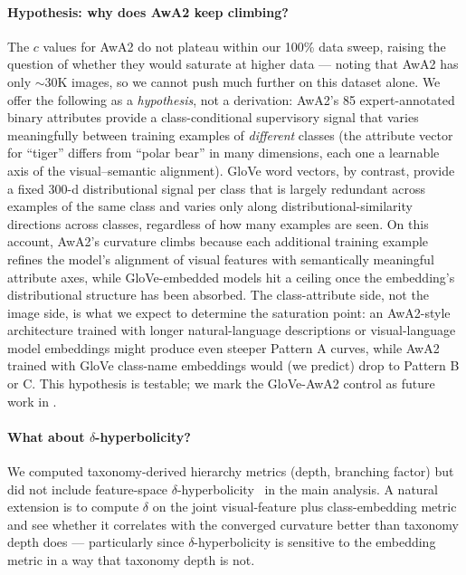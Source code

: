 \documentclass{article}
\begin{document}
\paragraph{Hypothesis: why does AwA2 keep climbing?}
The $c$ values for AwA2 do not plateau within our 100\% data sweep, raising the question of whether they would saturate at higher data --- noting that AwA2 has only $\sim$30K images, so we cannot push much further on this dataset alone.
We offer the following as a \emph{hypothesis}, not a derivation: AwA2's 85 expert-annotated binary attributes provide a class-conditional supervisory signal that varies meaningfully between training examples of \emph{different} classes (the attribute vector for ``tiger'' differs from ``polar bear'' in many dimensions, each one a learnable axis of the visual--semantic alignment).
GloVe word vectors, by contrast, provide a fixed 300-d distributional signal per class that is largely redundant across examples of the same class and varies only along distributional-similarity directions across classes, regardless of how many examples are seen.
On this account, AwA2's curvature climbs because each additional training example refines the model's alignment of visual features with semantically meaningful attribute axes, while GloVe-embedded models hit a ceiling once the embedding's distributional structure has been absorbed.
The class-attribute side, not the image side, is what we expect to determine the saturation point: an AwA2-style architecture trained with longer natural-language descriptions or visual-language model embeddings might produce even steeper Pattern A curves, while AwA2 trained with GloVe class-name embeddings would (we predict) drop to Pattern B or C.
This hypothesis is testable; we mark the GloVe-AwA2 control as future work in .

\paragraph{What about $\delta$-hyperbolicity?}
We computed taxonomy-derived hierarchy metrics (depth, branching factor) but did not include feature-space $\delta$-hyperbolicity~\cite{gromov1987hyperbolic,fournier2015hyperbolicity} in the main analysis.
A natural extension is to compute $\delta$ on the joint visual-feature plus class-embedding metric and see whether it correlates with the converged curvature better than taxonomy depth does --- particularly since $\delta$-hyperbolicity is sensitive to the embedding metric in a way that taxonomy depth is not.
\end{document}
